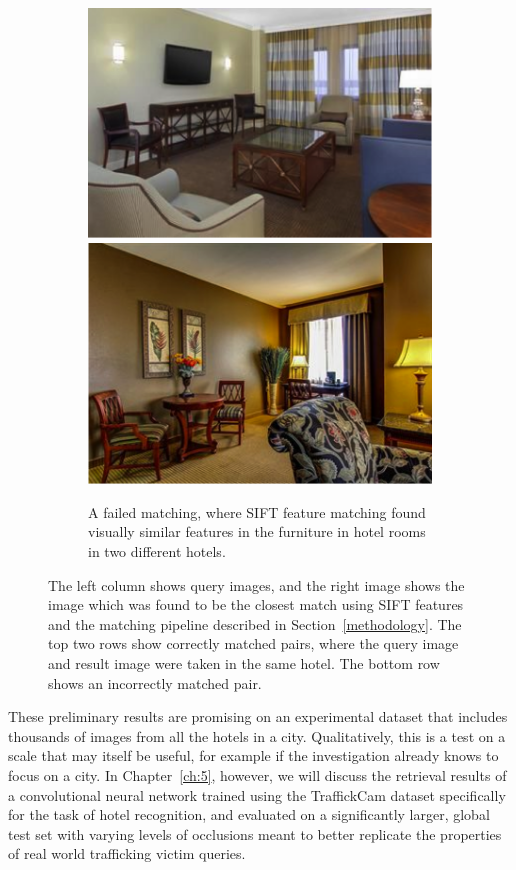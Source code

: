 \begin{figure}[p]
\begin{center}
  \begin{subfigure}[b]{.9\textwidth}
    \includegraphics[width=.5\columnwidth]{figures/chapter2/bad1a.png}
    \includegraphics[width=.5\columnwidth]{figures/chapter2/bad1b.png}
    \caption{A failed matching, where SIFT feature matching found visually similar features in the furniture in hotel rooms in two different hotels.}
  \end{subfigure}
  
  \caption{The left column shows query images, and the right image shows the image which was found to be the closest match using SIFT features and the matching pipeline described in Section~\ref{methodology}. The top two rows show correctly matched pairs, where the query image and result image were taken in the same hotel. The bottom row shows an incorrectly matched pair.}
  \label{results}
  \end{center}
\end{figure}

These preliminary results are promising on an experimental dataset that includes thousands of images from all the hotels in a city.  Qualitatively, this is a test on a scale that may itself be useful, for example if the investigation already knows to focus on a city. In Chapter~\ref{ch:5}, however, we will discuss the retrieval results of a convolutional neural network trained using the TraffickCam dataset specifically for the task of hotel recognition, and evaluated on a significantly larger, global test set with varying levels of occlusions meant to better replicate the properties of real world trafficking victim queries.